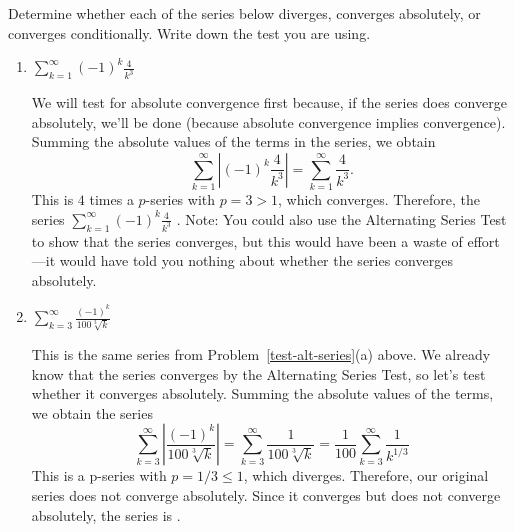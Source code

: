 \documentclass[main]{subfiles}
\begin{document}
\begin{enumerate}
\begin{problem}
Determine whether each of the series below diverges, converges absolutely, or converges 
conditionally. Write down the test you are using. 
\end{problem}

\begin{enumerate}
  \item  
  \begin{problem}[\vfill] 
     $\displaystyle \sum_{k=1}^\infty (-1)^k\frac{4}{k^3}$
  \end{problem}

  \begin{solution}
  We will test for absolute convergence first because, if the series does
  converge absolutely, we'll be done (because absolute convergence implies
  convergence).  Summing the absolute values of the terms in the series,
  we obtain
  \[\sum_{k=1}^\infty \left|(-1)^k\frac{4}{k^3}\right| = \sum_{k=1}^\infty \frac{4}{k^3}.\]
  This is $4$ times a $p$-series with $p = 3 > 1$, which converges.  Therefore,
  the series $\displaystyle \sum_{k=1}^\infty (-1)^k\frac{4}{k^3}$  
  .  Note:  You could also use the Alternating
  Series Test to show that the series converges, but this would have been
  a waste of effort---it would have told you nothing about whether the
  series converges absolutely.
  \end{solution}



  \item  
  \begin{problem}[\vfill] 
     $\displaystyle\sum_{k=3}^\infty\frac{(-1)^k}{100\sqrt[3]{k}}$
  \end{problem}

  \begin{solution}
  This is the same series from Problem~\ref{test-alt-series}(a) above.
  We already know that the series converges by the Alternating Series Test,
  so let's test whether it converges absolutely.  Summing the absolute
  values of the terms, we obtain the series
  \[ \displaystyle\sum_{k=3}^\infty   \left|\frac{(-1)^k}{100\sqrt[3]{k}} \right| = 
  \displaystyle\sum_{k=3}^\infty\frac{1}{100\sqrt[3]{k}} = \frac{1}{100}  
  \sum_{k=3}^\infty\frac{1}{{k}^{1/3}}\]  This is a p-series with $p=1/3 \leq 1$, 
  which diverges.  Therefore, our original series does not converge absolutely.
  Since it converges but does not converge absolutely, the series is 
  .
  \end{solution}



\end{enumerate}
\end{enumerate}
\end{document}

